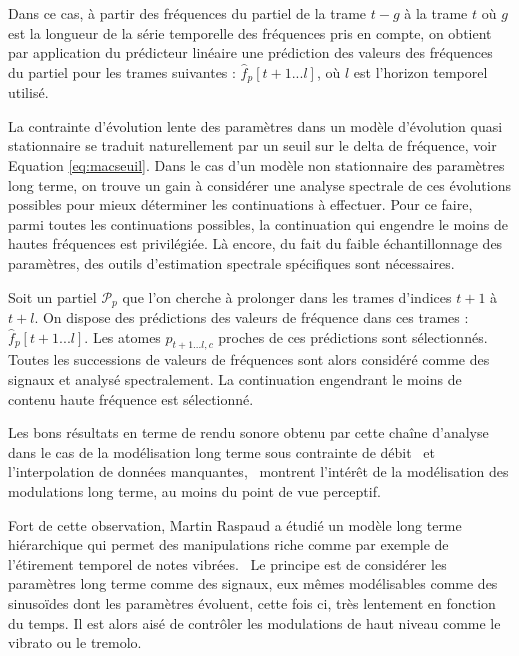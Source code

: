 Dans ce cas, à partir des fréquences du partiel de la trame $t-g$ à la trame $t$ où $g$ est la longueur de la série temporelle des fréquences pris en compte, on obtient par application du prédicteur linéaire une prédiction des valeurs des fréquences du partiel pour les trames suivantes : $\hat{f}_{p}[t+1...l]$, où $l$ est l'horizon temporel utilisé.

La contrainte d'évolution lente des paramètres dans un modèle d'évolution quasi stationnaire se traduit naturellement par un seuil sur le delta de fréquence, voir Equation \ref{eq:macseuil}. Dans le cas d'un modèle non stationnaire des paramètres long terme, on trouve un gain à considérer une analyse spectrale de ces évolutions possibles pour mieux déterminer les continuations à effectuer. Pour ce faire, parmi toutes les continuations possibles, la continuation qui engendre le moins de hautes fréquences est privilégiée. Là encore, du fait du faible échantillonnage des paramètres, des outils d'estimation spectrale spécifiques sont nécessaires.

Soit un partiel $\mathcal{P}_{p}$ que l'on cherche à prolonger dans les trames d'indices $t+1$ à $t+l$. On dispose des prédictions des valeurs de fréquence dans ces trames : $\hat{f}_{p}[t+1...l]$. Les atomes $p_{t+1...l, c}$ proches de ces prédictions sont sélectionnés. Toutes les successions de valeurs de fréquences sont alors considéré comme des signaux et analysé spectralement. La continuation engendrant le moins de contenu haute fréquence est sélectionné.


Les bons résultats en terme de rendu sonore obtenu par cette chaîne d'analyse dans le cas  de la modélisation long terme sous contrainte de débit~\cite{lagrangeTaslp06} et l'interpolation de données manquantes,~\cite{lagrangeJaes05} montrent l'intérêt de la modélisation des modulations long terme, au moins du point de vue perceptif.

Fort de cette observation, Martin Raspaud a étudié un modèle long terme hiérarchique qui permet des manipulations riche comme par exemple de l'étirement temporel de notes vibrées.~\cite{raspaud2007modeles} Le principe est de considérer les paramètres long terme comme des signaux, eux mêmes modélisables comme des sinusoïdes dont les paramètres évoluent, cette fois ci, très lentement en fonction du temps. Il est alors aisé de contrôler les modulations de haut niveau comme le vibrato ou le tremolo.




